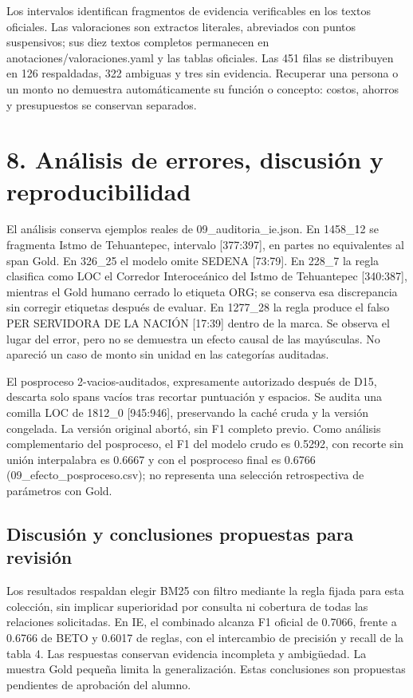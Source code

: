 \documentclass[11pt,a4paper]{article}
\begin{document}
\par
Los intervalos identifican fragmentos de evidencia verificables en los textos oficiales. Las valoraciones son extractos literales, abreviados con puntos suspensivos; sus diez textos completos permanecen en anotaciones/\allowbreak{}valoraciones.yaml y las tablas oficiales. Las 451 filas se distribuyen en 126 respaldadas, 322 ambiguas y tres sin evidencia. Recuperar una persona o un monto no demuestra automáticamente su función o concepto: costos, ahorros y presupuestos se conservan separados.
\par
\newpage
\par
\section*{8. Análisis de errores, discusión y reproducibilidad}
\par
El análisis conserva ejemplos reales de 09\_\allowbreak{}auditoria\_\allowbreak{}ie.json. En 1458\_\allowbreak{}12 se fragmenta Istmo de Tehuantepec, intervalo [377:397], en partes no equivalentes al span Gold. En 326\_\allowbreak{}25 el modelo omite SEDENA [73:79]. En 228\_\allowbreak{}7 la regla clasifica como LOC el Corredor Interoceánico del Istmo de Tehuantepec [340:387], mientras el Gold humano cerrado lo etiqueta ORG; se conserva esa discrepancia sin corregir etiquetas después de evaluar. En 1277\_\allowbreak{}28 la regla produce el falso PER SERVIDORA DE LA NACIÓN [17:39] dentro de la marca. Se observa el lugar del error, pero no se demuestra un efecto causal de las mayúsculas. No apareció un caso de monto sin unidad en las categorías auditadas.
\par
El posproceso 2-vacios-auditados, expresamente autorizado después de D15, descarta solo spans vacíos tras recortar puntuación y espacios. Se audita una comilla LOC de 1812\_\allowbreak{}0 [945:946], preservando la caché cruda y la versión congelada. La versión original abortó, sin F1 completo previo. Como análisis complementario del posproceso, el F1 del modelo crudo es 0.5292, con recorte sin unión interpalabra es 0.6667 y con el posproceso final es 0.6766 (09\_\allowbreak{}efecto\_\allowbreak{}posproceso.csv); no representa una selección retrospectiva de parámetros con Gold.
\par
\subsection*{Discusión y conclusiones propuestas para revisión}
\par
Los resultados respaldan elegir BM25 con filtro mediante la regla fijada para esta colección, sin implicar superioridad por consulta ni cobertura de todas las relaciones solicitadas. En IE, el combinado alcanza F1 oficial de 0.7066, frente a 0.6766 de BETO y 0.6017 de reglas, con el intercambio de precisión y recall de la tabla 4. Las respuestas conservan evidencia incompleta y ambigüedad. La muestra Gold pequeña limita la generalización. Estas conclusiones son propuestas pendientes de aprobación del alumno.
\par
\end{document}

